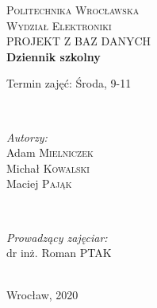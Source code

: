 \documentclass[12pt]{article}
\begin{document}
\begin{titlepage}
\center



\textsc{\Large Politechnika Wrocławska}\\[0.5cm] %
\textsc{\large Wydział Elektroniki}\\[5cm] %


\textsc{\LARGE PROJEKT Z BAZ DANYCH}\\[2cm] %
{ \Large \bfseries Dziennik szkolny}\\[5cm] %
\begin{minipage}{0.83\textwidth}
\begin{flushleft} \large
Termin zajęć: Środa, 9-11 \\[2cm]
\end{flushleft}
\end{minipage}
\\[2cm]


\begin{minipage}{0.4\textwidth}
\begin{flushleft} \large
\emph{Autorzy:}\\
Adam \textsc{Mielniczek}\\
Michał \textsc{Kowalski}\\
Maciej \textsc{Pająk}\\
\end{flushleft}
\end{minipage}
~
\begin{minipage}{0.4\textwidth}
\begin{flushright} \large
\emph{Prowadzący zajęciar:} \\
dr inż. Roman \textsc{PTAK} 
\end{flushright}
\end{minipage}\\[2cm]


{\large Wrocław, 2020}\\[1cm] %

\vfill 
\end{titlepage}
\end{document}
